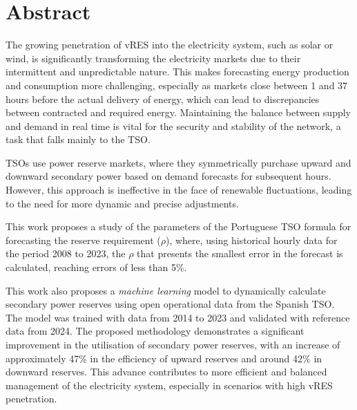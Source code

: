 \chapter{Abstract}
\justifying

The growing penetration of \gls{vRES} into the electricity system, such as solar or wind, is significantly transforming the electricity markets due to their intermittent and unpredictable nature. This makes forecasting energy production and consumption more challenging, especially as markets close between 1 and 37 hours before the actual delivery of energy, which can lead to discrepancies between contracted and required energy. Maintaining the balance between supply and demand in real time is vital for the security and stability of the network, a task that falls mainly to the \gls{TSO}.\par
\gls{TSO}s use power reserve markets, where they symmetrically purchase upward and downward secondary power based on demand forecasts for subsequent hours. However, this approach is ineffective in the face of renewable fluctuations, leading to the need for more dynamic and precise adjustments.\par
This work proposes a study of the parameters of the Portuguese \gls{TSO} formula for forecasting the reserve requirement ($\rho$), where, using historical hourly data for the period 2008 to 2023, the $\rho$ that presents the smallest error in the forecast is calculated, reaching errors of less than 5\%.\par
This work also proposes a \textit{machine learning} model to dynamically calculate secondary power reserves using open operational data from the Spanish \gls{TSO}. The model was trained with data from 2014 to 2023 and validated with reference data from 2024. The proposed methodology demonstrates a significant improvement in the utilisation of secondary power reserves, with an increase of approximately 47\% in the efficiency of upward reserves and around 42\% in downward reserves. This advance contributes to more efficient and balanced management of the electricity system, especially in scenarios with high \gls{vRES} penetration.



\vspace{0.5cm} %

